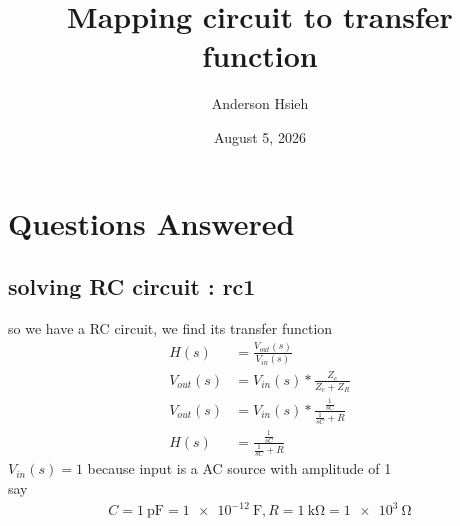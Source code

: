 \documentclass{article}
\title{Mapping circuit to transfer function}
\author{Anderson Hsieh}
\date{August 5, 2026}
\begin{document}
\maketitle

\section{Questions Answered}
    \subsection{solving RC circuit : rc1}
    so we have a RC circuit, we find its transfer function 
    \begin{align*}
        H(s)&=\frac{V_{out}(s)}{V_{in}(s)}\\
        V_{out}(s)&=V_{in}(s)*\frac{Z_c}{Z_c+Z_R}\\
        V_{out}(s)&=V_{in}(s)*\frac{\frac{1}{sC}}{\frac{1}{sC}+R}\\
        H(s)&=\frac{\frac{1}{sC}}{\frac{1}{sC}+R}
    \end{align*}
    $V_{in}(s) = 1$ because input is a AC source with amplitude of 1\\
    say 
    \begin{align*}
        C = \SI{1}{\pico\farad} = \SI{1e-12}{\farad}, R = \SI{1}{\kilo\ohm} = \SI{1e3}{\ohm}
    \end{align*}
\end{document}
